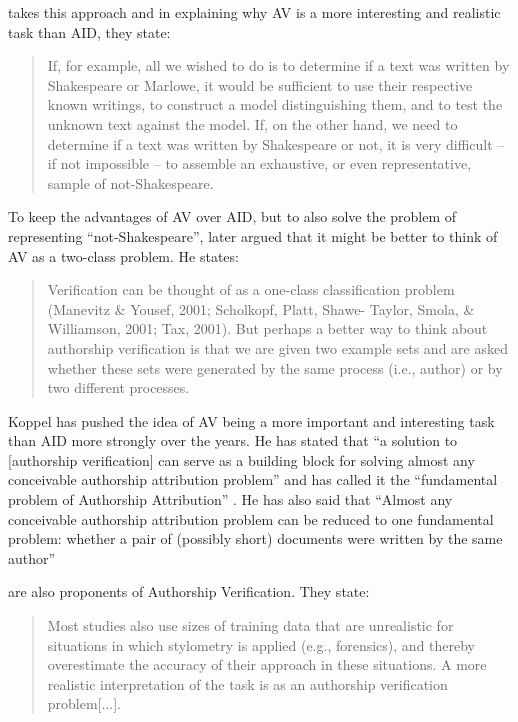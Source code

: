 \citet{koppel2004authorship} takes this approach and in explaining why AV is a more interesting and realistic task than AID, they state:

\begin{quote}
If, for example, all we wished to do is to determine if a text was written by Shakespeare or Marlowe, it would be sufficient to use their respective known writings, to construct a model distinguishing them, and to test the unknown text against the model. If, on the other hand, we need to determine if a text was written by Shakespeare or not, it is very difficult – if not impossible – to assemble an exhaustive, or even representative, sample of not-Shakespeare.     
\end{quote}

To keep the advantages of AV over AID, but to also solve the problem of representing ``not-Shakespeare'', \citet{koppel2009computational} later argued that it might be better to think of AV as a two-class problem. He states:
\begin{quote}
Verification can be thought of as a one-class classification problem (Manevitz \& Yousef, 2001; Scholkopf, Platt, Shawe- Taylor, Smola, \& Williamson, 2001; Tax, 2001). But perhaps a better way to think about authorship verification is that we are given two example sets and are asked whether these sets were generated by the same process (i.e., author) or by two different processes.    
\end{quote}


Koppel has pushed the idea of AV being a more important and interesting task than AID more strongly over the years. He has stated that ``a solution to [authorship verification] can serve as a building block for solving almost any conceivable authorship attribution problem'' \cite{koppel2012fundamental} and has called it the ``fundamental problem of Authorship Attribution'' \cite{koppel2012fundamental,koppel2012authorship}. He has also said that ``Almost any conceivable authorship attribution problem can be reduced to one fundamental problem: whether a pair of (possibly short) documents were written by the same author'' \cite{koppel2014determining}

\citet{luyckx2008authorship} are also proponents of Authorship Verification. They state:

\begin{quote}
Most studies also use sizes of training data that are unrealistic for situations in which stylometry is applied (e.g., forensics), and thereby overestimate the accuracy of their approach in these situations. A more realistic interpretation of the task is as an authorship verification problem[...].
\end{quote}


